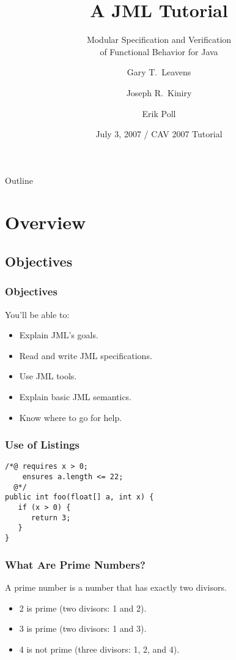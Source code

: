 \documentclass[compress]{beamer}
\title[JML Tutorial]{A JML Tutorial}
\subtitle{Modular Specification and Verification \\
of Functional Behavior for Java}
\author[Gary T. Leavens] %
{Gary T.~Leavens\inst{1} \and Joseph R.~Kiniry\inst{2} \and Erik Poll\inst{3}}
\institute[ISU] %
{
  \inst{1}%
  Department of Computer Science\\
  Iowa State University (moving to UCF)
  \and
  \inst{2}%
  School of Computer Science and Informatics \\
  University College Dublin
  \and
  \inst{3}%
  Computing Science Department \\
  Radboud University Nijmegen
}
\date[CAV 2007]{July 3, 2007 / CAV 2007 Tutorial}
\begin{document}
\begin{frame}
  \titlepage
\end{frame}

\begin{frame}{Outline}
  \tableofcontents
\end{frame}


\section{Overview}

\subsection{Objectives}

\begin{frame}
\frametitle{Objectives}

You'll be able to:
  \begin{itemize}
  \item
    Explain JML's goals.
  \item
    Read and write JML specifications.
  \item
    Use JML tools.
  \item
    Explain basic JML semantics.
  \item
    Know where to go for help.
  \end{itemize}
\end{frame}

\begin{frame}[fragile]
\frametitle{Use of Listings}
\begin{lstlisting}
/*@ requires x > 0; 
    ensures a.length <= 22; 
  @*/
public int foo(float[] a, int x) {
   if (x > 0) {
      return 3;
   }
}
\end{lstlisting}
\end{frame}

\begin{frame}
\frametitle{What Are Prime Numbers?}
\begin{definition}
A \alert{prime number} is a number that has exactly two divisors.
\end{definition}
\begin{example}
\begin{itemize}
\item 2 is prime (two divisors: 1 and 2).
\item 3 is prime (two divisors: 1 and 3).
\item 4 is not prime (\alert{three} divisors: 1, 2, and 4).
\end{itemize}
\end{example}
\end{frame}
\end{document}
